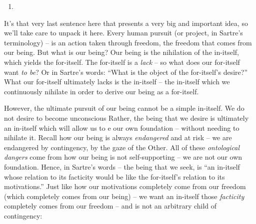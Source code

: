 \begin{enumerate}
\begin{enumerate}
    \item {}
    \item {}
    \item {}
  \end{enumerate}
  \item {}
\end{enumerate}

It's that very last sentence here that presents a very big and important idea, so we'll take care to unpack it here. Every human pursuit (or project, in Sartre's terminology) -- is an action taken through freedom, the freedom that comes from our being. But what is our being? Our being is the nihilation of the in-itself, which yields the for-itself. The for-itself is a \emph{lack} -- so what does our for-itself want \emph{to be}? Or in Sartre's words: \enquote{What is the object of the for-itself's desire?} What our for-itself ultimately lacks is the in-itself -- the in-itself which we continuously nihilate in order to derive our being as a for-itself. 

However, the ultimate pursuit of our being cannot be a simple in-itself. We do not desire to become unconscious Rather, the being that we desire is ultimately an in-itself which will allow us to e our own foundation -- without needing to nihilate it. Recall how our being is always \emph{endangered} and at risk -- we are endangered by contingency, by the gaze of the Other. All of these \emph{ontological dangers} come from how our being is not self-supporting -- we are not our own foundation. Hence, in Sartre's words -- the being that we seek, is \enquote{an in-itself whose relation to its facticity would be like the for-itself's relation to its motivations.} Just like how our motivations completely come from our freedom (which completely comes from our being) -- we want an in-itself those \emph{facticity} completely comes from our freedom -- and is not an arbitrary child of contingency:

